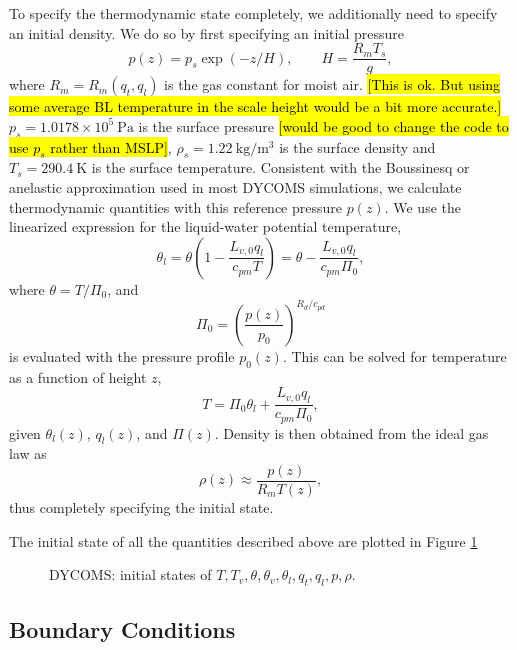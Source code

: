 \documentclass{report}
\begin{document}
To specify the thermodynamic state completely, we additionally need to specify an initial density. We do so by first specifying an initial pressure
\[
p(z) = p_{s} \exp(-z/H), \qquad H = \frac{R_m T_s}{g},
\]
where $R_m = R_m(q_t, q_l)$ is the gas constant for moist air. \hl{[This is ok. But using some average BL temperature in the scale height would be a bit more accurate.]} $p_s = 1.0178\times 10^{5}~\mathrm{Pa}$ is the surface pressure \hl{[would be good to change the code to use $p_s$ rather than MSLP]}, $\rho_s = 1.22~\mathrm{kg/m^3}$ is the surface density and $T_s = 290.4~\mathrm{K}$ is the surface temperature. Consistent with the Boussinesq or anelastic approximation used in most DYCOMS simulations, we calculate thermodynamic quantities with this reference pressure $p(z)$. We use the linearized expression for the liquid-water potential temperature,
\begin{equation}
    \label{e:betts1973}
    \theta_l = \theta \left(1 - \frac{L_{v,0} q_l}{c_{pm} T} \right) = \theta - \frac{L_{v,0} q_l}{c_{pm} \Pi_0},
\end{equation}
where $\theta = T/\Pi_0$, and 
\[
\Pi_0 = \left( \frac{p(z)}{p_0} \right)^{R_d/c_{pd}}
\]
is evaluated with the pressure profile $p_0(z)$. This can be solved for temperature as a function of height $z$,
\[
T = \Pi_0 \theta_l + \frac{L_{v,0} q_l}{c_{pm} \Pi_0},
\]
given $\theta_l(z)$, $q_l(z)$, and $\Pi(z)$. Density is then obtained from the ideal gas law as
\[
\rho(z) \approx \frac{p(z)}{R_m T(z)},
\]
thus completely specifying the initial state. 

The initial state of all the quantities described above are plotted in Figure \ref{dycomsInitFig}
\begin{figure}
      \caption{DYCOMS: initial states of $T, T_v, \theta, \theta_v, \theta_l, q_t, q_l, p, \rho$.}
\label{dycomsInitFig}
\end{figure}

\subsection{Boundary Conditions}
\end{document}

